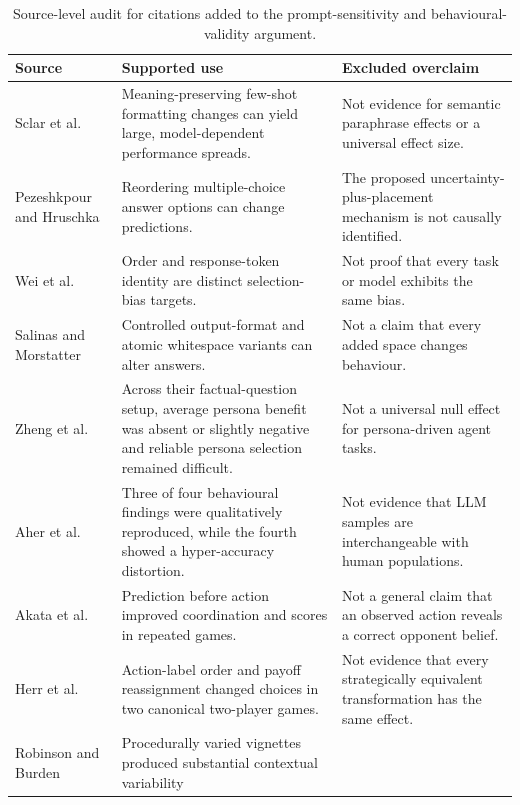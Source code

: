 \documentclass[sigconf]{aamas}
\begin{document}
\begin{table}[t]
\caption{Source-level audit for citations added to the prompt-sensitivity
and behavioural-validity argument.}
\label{tab:citation-audit}
\small
\begin{tabular}{@{}p{}p{}p{}@{}}
\toprule
Source & Supported use & Excluded overclaim \\
\midrule
Sclar et al.~\citep{sclarPromptFormatting2024} &
Meaning-preserving few-shot formatting changes can yield large,
model-dependent performance spreads. &
Not evidence for semantic paraphrase effects or a universal effect size. \\
Pezeshkpour and Hruschka~\citep{pezeshkpourOptionOrder2024} &
Reordering multiple-choice answer options can change predictions. &
The proposed uncertainty-plus-placement mechanism is not causally
identified. \\
Wei et al.~\citep{weiSelectionBias2024} &
Order and response-token identity are distinct selection-bias targets. &
Not proof that every task or model exhibits the same bias. \\
Salinas and Morstatter~\citep{salinasButterfly2024} &
Controlled output-format and atomic whitespace variants can alter answers. &
Not a claim that every added space changes behaviour. \\
Zheng et al.~\citep{zhengPersona2024} &
Across their factual-question setup, average persona benefit was absent or
slightly negative and reliable persona selection remained difficult. &
Not a universal null effect for persona-driven agent tasks. \\
Aher et al.~\citep{using_llm_to_simulate} &
Three of four behavioural findings were qualitatively reproduced, while the
fourth showed a hyper-accuracy distortion. &
Not evidence that LLM samples are interchangeable with human populations. \\
Akata et al.~\citep{playing_repeated_games_with_llms} &
Prediction before action improved coordination and scores in repeated games. &
Not a general claim that an observed action reveals a correct opponent
belief. \\
Herr et al.~\citep{herrStrategicBias2024} &
Action-label order and payoff reassignment changed choices in two canonical
two-player games. &
Not evidence that every strategically equivalent transformation has the same
effect. \\
Robinson and Burden~\citep{robinsonBurdenFraming2025} &
Procedurally varied vignettes produced substantial contextual variability

\end{tabular}
\end{table}
\end{document}
